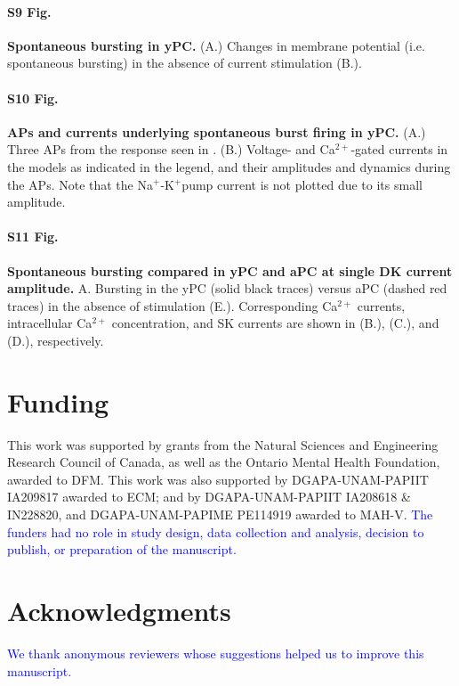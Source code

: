 \documentclass[10pt,letterpaper]{article}
\newcommand{\Ca}{Ca$^{2+}$}
\newcommand{\K}{K$^{+}$}
\newcommand{\Na}{Na$^{+}$}
\newcommand{\edit}[1]{\textcolor{blue}{#1}}
\begin{document}
\paragraph*{S9 Fig.}
\label{S9_Fig}
{\bf Spontaneous bursting in yPC.} (A.) Changes in membrane potential (i.e. spontaneous bursting) in the absence of current stimulation (B.).

\paragraph*{S10 Fig.}
\label{S10_Fig}
{\bf APs and currents underlying spontaneous burst firing in yPC.} (A.) Three APs from the response seen in . (B.) Voltage- and \Ca-gated currents in the models as indicated in the legend, and their amplitudes and dynamics during the APs. Note that the \Na-\K pump current is not plotted due to its small amplitude.

\paragraph*{S11 Fig.}
\label{S11_Fig}
{\bf Spontaneous bursting compared in yPC and aPC at single DK current amplitude.} A. Bursting in the yPC (solid black traces) versus aPC (dashed red traces) in the absence of stimulation (E.). Corresponding {\Ca} currents, intracellular {\Ca} concentration, and SK currents are shown in (B.), (C.), and (D.), respectively.

\color{black}

\section*{Funding} 
This work was supported by grants from the Natural Sciences and Engineering Research Council of Canada, as well as the Ontario Mental Health Foundation, awarded to DFM. This work was also supported by DGAPA-UNAM-PAPIIT IA209817 awarded to ECM; and by DGAPA-UNAM-PAPIIT IA208618 \& IN228820, and DGAPA-UNAM-PAPIME PE114919 awarded to MAH-V. \edit{The funders had no role in study design, data collection and analysis, decision to publish, or preparation of the manuscript.}  

\section*{Acknowledgments}
\edit{We thank anonymous reviewers whose suggestions helped us to improve this manuscript.}

\nolinenumbers
\end{document}
